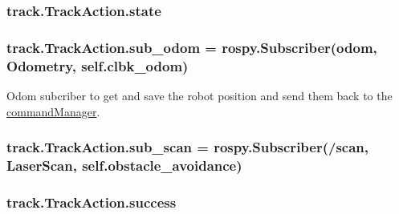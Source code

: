 \subsubsection[{\texorpdfstring{state}{state}}]{\setlength{\rightskip}{0pt plus 5cm}track.\+Track\+Action.\+state\hspace{0.3cm}{\ttfamily [static]}}\hypertarget{classtrack_1_1TrackAction_a56031d0f135cf2d2f7c950325059f7bd}{}\label{classtrack_1_1TrackAction_a56031d0f135cf2d2f7c950325059f7bd}
\subsubsection[{\texorpdfstring{sub\+\_\+odom}{sub_odom}}]{\setlength{\rightskip}{0pt plus 5cm}track.\+Track\+Action.\+sub\+\_\+odom = rospy.\+Subscriber(\textquotesingle{}odom\textquotesingle{}, Odometry, self.\+clbk\+\_\+odom)\hspace{0.3cm}{\ttfamily [static]}}\hypertarget{classtrack_1_1TrackAction_a4cbc03d130bcf2203bc68f37d02dc4c5}{}\label{classtrack_1_1TrackAction_a4cbc03d130bcf2203bc68f37d02dc4c5}


Odom subcriber to get and save the robot position and send them back to the \hyperlink{namespacecommandManager}{command\+Manager}. 

\subsubsection[{\texorpdfstring{sub\+\_\+scan}{sub_scan}}]{\setlength{\rightskip}{0pt plus 5cm}track.\+Track\+Action.\+sub\+\_\+scan = rospy.\+Subscriber(\textquotesingle{}/scan\textquotesingle{}, Laser\+Scan, self.\+obstacle\+\_\+avoidance)\hspace{0.3cm}{\ttfamily [static]}}\hypertarget{classtrack_1_1TrackAction_ae2e92f43c8c834aba95d6c87241553e6}{}\label{classtrack_1_1TrackAction_ae2e92f43c8c834aba95d6c87241553e6}
\subsubsection[{\texorpdfstring{success}{success}}]{\setlength{\rightskip}{0pt plus 5cm}track.\+Track\+Action.\+success\hspace{0.3cm}{\ttfamily [static]}}\hypertarget{classtrack_1_1TrackAction_a8c79189ba62cf316bffaa4c00b0320fe}{}\label{classtrack_1_1TrackAction_a8c79189ba62cf316bffaa4c00b0320fe}



